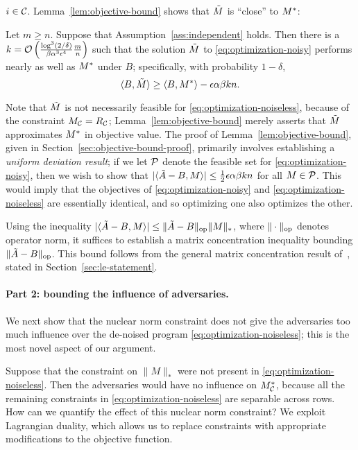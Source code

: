 $i \in \mathcal{C}$. Lemma~\ref{lem:objective-bound} shows that $\tilde{M}$ is ``close'' to $M^*$: 
\begin{lemma}
\label{lem:objective-bound}
Let $m \geq n$. Suppose that Assumption~\ref{ass:independent} holds. Then there is 
a 
$k = \mathcal{O}\left(  \frac{\log^3(2/\delta)}{\beta\alpha^3\epsilon^4}\frac{m}{n} \right)$ 
such that the solution $\tilde{M}$ to \eqref{eq:optimization-noisy} performs nearly as 
well as $M^*$ under $B$; specifically, with probability $1-\delta$,
\begin{equation}
\label{eq:objective-bound}
\langle B, \tilde{M} \rangle \geq \langle B, M^* \rangle - \epsilon \alpha\beta kn.
\end{equation}
\end{lemma}
Note that $\tilde{M}$ is not necessarily feasible for \eqref{eq:optimization-noiseless}, 
because of the constraint $M_{\mathcal{C}} = R_{\mathcal{C}}$; Lemma~\ref{lem:objective-bound} 
merely asserts that $\tilde{M}$ approximates $M^*$ in objective value. The proof of 
Lemma~\ref{lem:objective-bound}, given in Section~\ref{sec:objective-bound-proof}, 
primarily involves establishing a 
\emph{uniform deviation result}; if we let $\mathcal{P}$ denote the feasible set for 
\eqref{eq:optimization-noisy}, then we wish to show that 
$|\langle \tilde{A} - B, M \rangle| \leq \frac{1}{2}\epsilon \alpha\beta kn$ for all 
$M \in \mathcal{P}$. This would imply that the objectives of 
\eqref{eq:optimization-noisy} and \eqref{eq:optimization-noiseless} are 
essentially identical, and so optimizing one also optimizes the other.

Using the inequality $|\langle \tilde{A} - B, M \rangle| \leq \|\tilde{A}-B\|_{\mathrm{op}}\|M\|_*$, 
where $\|\cdot\|_{\mathrm{op}}$ denotes operator norm, it suffices to establish a matrix 
concentration inequality bounding $\|\tilde{A} - B\|_{\mathrm{op}}$.   
This bound follows from the general matrix concentration result of~\cite{le2015concentration},
stated in Section~\ref{sec:le-statement}.

\paragraph{Part 2: bounding the influence of adversaries.} 
We next show that the nuclear norm constraint does 
not give the adversaries too much influence over the de-noised program 
\eqref{eq:optimization-noiseless}; this is the most novel aspect 
of our argument.




Suppose that the constraint on $\|M\|_*$ were not present in 
\eqref{eq:optimization-noiseless}. Then the adversaries would have 
no influence on $M^*_{\mathcal{C}}$, because all the remaining constraints 
in \eqref{eq:optimization-noiseless} are separable across rows. 
How can we quantify the effect of this nuclear norm constraint?
We exploit Lagrangian duality, which allows us to replace constraints 
with appropriate modifications to the objective function.

